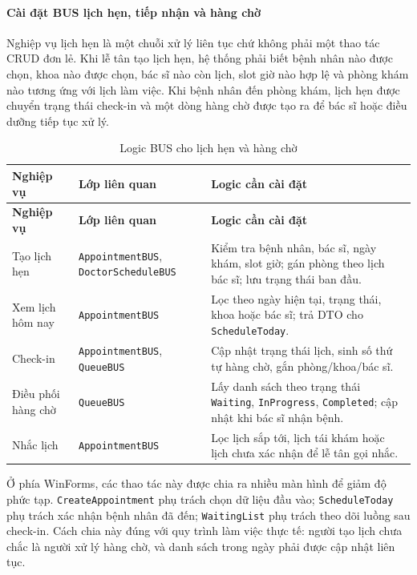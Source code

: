 \documentclass[12pt,a4paper]{article}
\numberwithin{figure}{subsection}
\numberwithin{table}{subsection}
\begin{document}
\paragraph{Cài đặt BUS lịch hẹn, tiếp nhận và hàng chờ}

Nghiệp vụ lịch hẹn là một chuỗi xử lý liên tục chứ không phải một thao tác CRUD đơn lẻ. Khi lễ tân tạo lịch hẹn, hệ thống phải biết bệnh nhân nào được chọn, khoa nào được chọn, bác sĩ nào còn lịch, slot giờ nào hợp lệ và phòng khám nào tương ứng với lịch làm việc. Khi bệnh nhân đến phòng khám, lịch hẹn được chuyển trạng thái check-in và một dòng hàng chờ được tạo ra để bác sĩ hoặc điều dưỡng tiếp tục xử lý.

\begin{longtable}{|p{3.4cm}|p{4.6cm}|p{5.8cm}|}
\caption{Logic BUS cho lịch hẹn và hàng chờ} \\
\hline
\textbf{Nghiệp vụ} & \textbf{Lớp liên quan} & \textbf{Logic cần cài đặt} \\
\hline
\endfirsthead
\hline
\textbf{Nghiệp vụ} & \textbf{Lớp liên quan} & \textbf{Logic cần cài đặt} \\
\hline
\endhead
Tạo lịch hẹn & \texttt{AppointmentBUS}, \texttt{DoctorScheduleBUS} & Kiểm tra bệnh nhân, bác sĩ, ngày khám, slot giờ; gán phòng theo lịch bác sĩ; lưu trạng thái ban đầu. \\
\hline
Xem lịch hôm nay & \texttt{AppointmentBUS} & Lọc theo ngày hiện tại, trạng thái, khoa hoặc bác sĩ; trả DTO cho \texttt{ScheduleToday}. \\
\hline
Check-in & \texttt{AppointmentBUS}, \texttt{QueueBUS} & Cập nhật trạng thái lịch, sinh số thứ tự hàng chờ, gắn phòng/khoa/bác sĩ. \\
\hline
Điều phối hàng chờ & \texttt{QueueBUS} & Lấy danh sách theo trạng thái \texttt{Waiting}, \texttt{InProgress}, \texttt{Completed}; cập nhật khi bác sĩ nhận bệnh. \\
\hline
Nhắc lịch & \texttt{AppointmentBUS} & Lọc lịch sắp tới, lịch tái khám hoặc lịch chưa xác nhận để lễ tân gọi nhắc. \\
\hline
\end{longtable}

Ở phía WinForms, các thao tác này được chia ra nhiều màn hình để giảm độ phức tạp. \texttt{CreateAppointment} phụ trách chọn dữ liệu đầu vào; \texttt{ScheduleToday} phụ trách xác nhận bệnh nhân đã đến; \texttt{WaitingList} phụ trách theo dõi luồng sau check-in. Cách chia này đúng với quy trình làm việc thực tế: người tạo lịch chưa chắc là người xử lý hàng chờ, và danh sách trong ngày phải được cập nhật liên tục.
\end{document}
